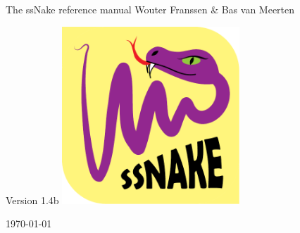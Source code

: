 %
%
%
%

\begin{titlepage}
\begin{center}




{\Huge The ssNake reference manual}
\vfill
\large Wouter Franssen \& Bas van Meerten

\vspace{1cm}
\large Version 1.4b
\vfill
\includegraphics[width=0.5\textwidth]{Images/logo.pdf}\

\vfill
\vfill
{\large \today}

\end{center}

\end{titlepage}
